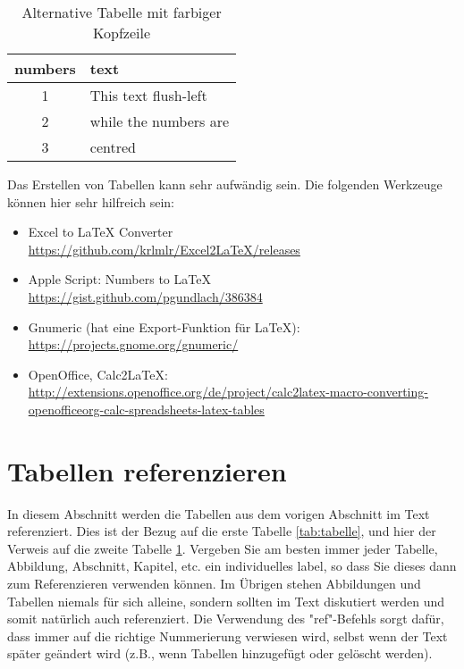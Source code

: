 \begin{table}[ht]
    \vspace{0.5em}
	\centering
	\begin{tabular}{|c|l|}
		\hline
		\rowcolor[gray]{0.9}\textbf{numbers} & \textbf{text} \\
		\hline
		\hline
		1 & This text flush-left \\
		\hline
		2 & while the numbers are \\
		\hline
		3 & centred \\
		\hline
	\end{tabular}
	\caption[Alternative Tabelle]{Alternative Tabelle mit farbiger Kopfzeile}
	\label{tab:tablealternative}
	\vspace{0.5em}
\end{table}


Das Erstellen von Tabellen kann sehr aufwändig sein. Die folgenden Werkzeuge können hier sehr hilfreich sein:

\begin{itemize}
	\item Excel to \LaTeX{} Converter\\ \url{https://github.com/krlmlr/Excel2LaTeX/releases}
	\item Apple Script: Numbers to \LaTeX{} \\ \url{https://gist.github.com/pgundlach/386384}
	\item Gnumeric (hat eine Export-Funktion für \LaTeX{}): \\ \url{https://projects.gnome.org/gnumeric/}
	\item OpenOffice, Calc2LaTeX: \url{http://extensions.openoffice.org/de/project/calc2latex-macro-converting-openofficeorg-calc-spreadsheets-latex-tables}
\end{itemize}

\section{Tabellen referenzieren}
\label{sec:tabellen_ref}
In diesem Abschnitt werden die Tabellen aus dem vorigen Abschnitt im Text referenziert. Dies ist der Bezug auf die erste Tabelle \ref{tab:tabelle}, und hier der Verweis auf die zweite Tabelle \ref{tab:tablealternative}. Vergeben Sie am besten immer jeder Tabelle, Abbildung, Abschnitt, Kapitel, etc. ein individuelles label, so dass Sie dieses dann zum Referenzieren verwenden können. Im Übrigen stehen Abbildungen und Tabellen niemals für sich alleine, sondern sollten im Text diskutiert werden und somit natürlich auch referenziert. Die Verwendung des "ref{}"-Befehls sorgt dafür, dass immer auf die richtige Nummerierung verwiesen wird, selbst wenn der Text später geändert wird (z.B., wenn Tabellen hinzugefügt oder gelöscht werden). 

